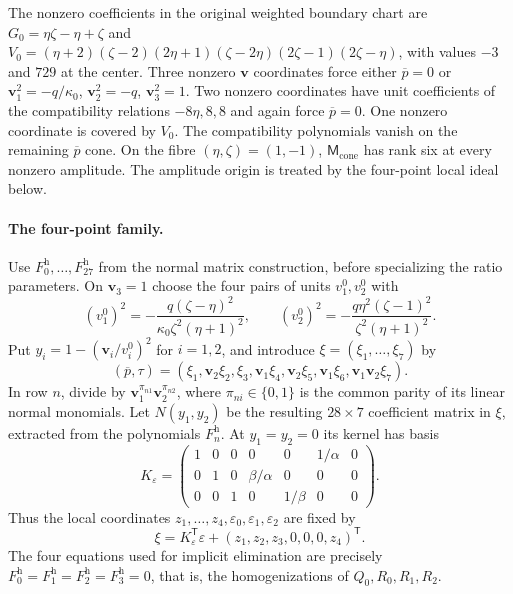 \documentclass[11pt,a4paper]{article}
\numberwithin{equation}{section}
\theoremstyle{plain}
\theoremstyle{definition}
\theoremstyle{remark}
\begin{document}
The nonzero coefficients in the original weighted boundary chart are $G_0=\eta \zeta -\eta +\zeta $ and $V_0=(\eta +2)(\zeta -2)(2\eta +1)(\zeta -2\eta )(2\zeta -1)(2\zeta -\eta )$, with values $-3$ and $729$ at the center. Three nonzero $\boldsymbol v$ coordinates force either $\overline p=0$ or $\boldsymbol v_1^2=-q/\kappa_0 $, $\boldsymbol v_2^2=-q$, $\boldsymbol v_3^2=1$. Two nonzero coordinates have unit coefficients of the compatibility relations $-8\eta ,8,8$ and again force $\overline p=0$. One nonzero coordinate is covered by $V_0$.
The compatibility polynomials vanish on the remaining $\overline p$ cone.
On the fibre $(\eta,\zeta)=(1,-1)$, $\mathsf M_{\mathrm{cone}}$ has rank six at every
nonzero amplitude. The amplitude origin is treated by the four-point
local ideal below.

\paragraph{The four-point family.}
Use $F_0^{\mathrm h},\ldots,F_{27}^{\mathrm h}$ from the normal matrix
construction, before specializing the ratio parameters. On $\boldsymbol v_3=1$
choose the four pairs of units $v_1^0,v_2^0$ with
\[
 (v_1^0)^2=-\frac{q(\zeta-\eta)^2}{\kappa_0\zeta^2(\eta+1)^2},\qquad
 (v_2^0)^2=-\frac{q\eta^2(\zeta-1)^2}{\zeta^2(\eta+1)^2}.
\]
Put $y_i=1-(\boldsymbol v_i/v_i^0)^2$ for $i=1,2$, and introduce
$\xi=(\xi_1,\ldots,\xi_7)$ by
\[
 (\overline p,\tau)=
 (\xi_1,\boldsymbol v_2\xi_2,\xi_3,
 \boldsymbol v_1\xi_4,\boldsymbol v_2\xi_5,\boldsymbol v_1\xi_6,
 \boldsymbol v_1\boldsymbol v_2\xi_7).
\]
In row $n$, divide by $\boldsymbol v_1^{\pi_{n1}}
\boldsymbol v_2^{\pi_{n2}}$, where $\pi_{ni}\in\{0,1\}$ is the
common parity of its linear normal monomials. Let $N(y_1,y_2)$ be the
resulting $28\times7$ coefficient matrix in $\xi$, extracted from the
polynomials $F_n^{\mathrm h}$. At $y_1=y_2=0$ its kernel has basis
\[
 K_\varepsilon=\begin{pmatrix}
 1&0&0&0&0&1/\alpha&0\\
 0&1&0&\beta/\alpha&0&0&0\\
 0&0&1&0&1/\beta&0&0
 \end{pmatrix}.
\]
Thus the local coordinates $z_1,\ldots,z_4,\varepsilon_0,\varepsilon_1,
\varepsilon_2$ are fixed by
\[
 \xi=K_\varepsilon^{\mathsf T}\varepsilon
             +(z_1,z_2,z_3,0,0,0,z_4)^{\mathsf T}.
\]
The four equations used for implicit elimination are precisely
$F_0^{\mathrm h}=F_1^{\mathrm h}=F_2^{\mathrm h}=F_3^{\mathrm h}=0$,
that is, the homogenizations of $Q_0,R_0,R_1,R_2$.
\end{document}
